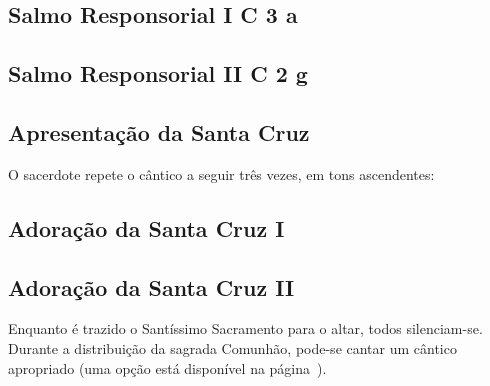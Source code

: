 
\subsection[Salmo Responsorial I]{Salmo Responsorial I \textmd{C 3 a}}\label{subsection:hebdomada-sancta/feria-6-in-passione-domini/psalmus-responsorius-1}

\subsection[Salmo Responsorial II]{Salmo Responsorial II \textmd{C 2 g}}\label{subsection:hebdomada-sancta/feria-6-in-passione-domini/psalmus-responsorius-1}

\AllowPageFlush

\subsection{Apresentação da Santa Cruz}\label{subsection:hebdomada-sancta/feria-6-in-passione-domini/ad-detegendam-sanctam-crucem}
\begin{rubrica}
  O sacerdote repete o cântico a seguir três vezes, em tons ascendentes:
\end{rubrica}

\subsection{Adoração da Santa Cruz I}\label{subsection:hebdomada-sancta/feria-6-in-passione-domini/ad-adoratione-sanctam-crucem-1}

\subsection{Adoração da Santa Cruz II}\label{subsection:hebdomada-sancta/feria-6-in-passione-domini/ad-adoratione-sanctam-crucem-2}

\begin{rubrica}
  Enquanto é trazido o Santíssimo Sacramento para o altar, todos silenciam-se. Durante a distribuição da sagrada Comunhão, pode-se cantar um cântico apropriado (uma opção está disponível na página~\pageref{appendix:feria-6-in-passio-domini/communio}).
\end{rubrica}